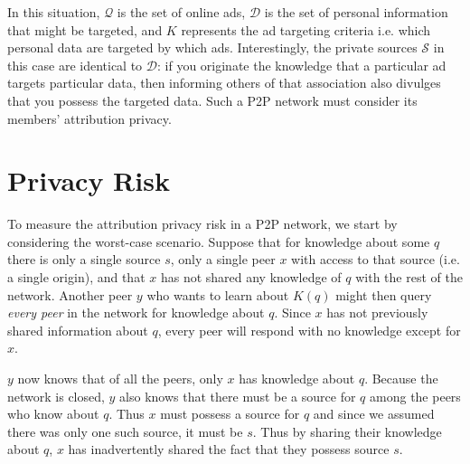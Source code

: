 \documentclass{article}
\begin{document}
In this situation, $\mathcal{Q}$ is the set of online ads, $\mathcal{D}$ is the
set of personal information that might be targeted, and $K$ represents the ad
targeting criteria i.e. which personal data are targeted by which ads.
Interestingly, the private sources $\mathcal{S}$ in this case are identical to
$\mathcal{D}$: if you originate the knowledge that a particular ad targets
particular data, then informing others of that association also divulges that
you possess the targeted data. Such a P2P network must consider its members'
attribution privacy.

\section{Privacy Risk}

To measure the attribution privacy risk in a P2P network, we start by
considering the worst-case scenario. Suppose that for knowledge about some $q$
there is only a single source $s$, only a single peer $x$ with access to that
source (i.e. a single origin), and that $x$ has not shared any knowledge of $q$
with the rest of the network. Another peer $y$ who wants to learn about $K(q)$
might then query {\it every peer} in the network for knowledge about $q$. Since
$x$ has not previously shared information about $q$, every peer will respond
with no knowledge except for $x$.

$y$ now knows that of all the peers, only $x$ has knowledge about $q$. Because
the network is closed, $y$ also knows that there must be a source for $q$ among
the peers who know about $q$. Thus $x$ must possess a source for $q$ and since
we assumed there was only one such source, it must be $s$. Thus by sharing their
knowledge about $q$, $x$ has inadvertently shared the fact that they possess
source $s$.
\end{document}
